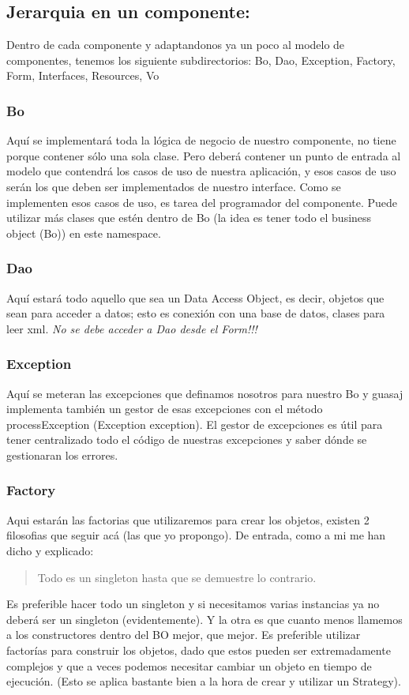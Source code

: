 \documentclass[a4paper]{article}
\begin{document}
\subsection{Jerarquia en un componente:}
Dentro de cada componente y adaptandonos ya un poco al modelo de componentes,
tenemos los siguiente subdirectorios: Bo, Dao, Exception, Factory, Form,
Interfaces, Resources, Vo
\subsubsection{Bo}
Aquí se implementará toda la lógica de negocio de nuestro componente, no tiene
porque contener sólo una sola clase. Pero deberá contener un punto de entrada al
modelo que contendrá los casos de uso de nuestra aplicación, y esos casos de uso
serán los que deben ser implementados de nuestro interface.  Como se implementen
esos casos de uso, es tarea del programador del componente.  Puede utilizar más
clases que estén dentro de Bo (la idea es tener todo el business object (Bo)) en
este namespace.
\subsubsection{Dao}
Aquí estará todo aquello que sea un Data Access Object, es decir, objetos que
sean para acceder a datos; esto es conexión con una base de datos, clases para
leer xml.  \emph{No se debe acceder a Dao desde el Form!!!}
\subsubsection{Exception}
Aquí se meteran las excepciones que definamos nosotros para nuestro Bo y guasaj
implementa también un gestor de esas excepciones con el método processException
(Exception exception).  El gestor de excepciones es útil para tener centralizado
todo el código de nuestras excepciones y saber dónde se gestionaran los errores.
\subsubsection{Factory}
Aqui estarán las factorias que utilizaremos para crear los objetos, existen 2
filosofias que seguir acá (las que yo propongo).  De entrada, como a mi me han
dicho y explicado:  
\begin{quote}
Todo es un singleton hasta que se demuestre lo contrario.
\end{quote}
Es preferible hacer todo un singleton y si necesitamos varias instancias ya no
deberá ser un singleton (evidentemente). 
Y la otra es que cuanto menos llamemos a los constructores dentro del BO mejor,
que mejor.  Es preferible utilizar factorías para construir los objetos, dado
que estos pueden ser extremadamente complejos y que a veces podemos necesitar
cambiar un objeto en tiempo de ejecución. (Esto se aplica bastante bien a la
hora de crear y utilizar un Strategy).
\end{document}
